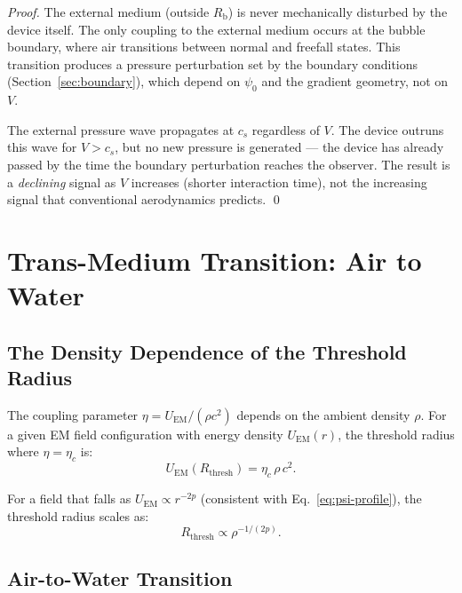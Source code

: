 \documentclass[12pt, letterpaper]{article}
\theoremstyle{definition}
\theoremstyle{remark}
\newcommand{\etac}{\eta_c}
\newcommand{\Rbub}{R_{\mathrm{b}}}
\newcommand{\cs}{c_s}
\begin{document}
\begin{proof}
The external medium (outside $\Rbub$) is never mechanically disturbed by the
device itself. The only coupling to the external medium occurs at the bubble
boundary, where air transitions between normal and freefall states. This
transition produces a pressure perturbation set by the boundary conditions
(Section~\ref{sec:boundary}), which depend on $\psi_0$ and the gradient
geometry, not on $V$.

The external pressure wave propagates at $\cs$ regardless of $V$. The device
outruns this wave for $V > \cs$, but no new pressure is generated --- the
device has already passed by the time the boundary perturbation reaches the
observer. The result is a \emph{declining} signal as $V$ increases (shorter
interaction time), not the increasing signal that conventional aerodynamics
predicts. \qed
\end{proof}

\section{Trans-Medium Transition: Air to Water}
\label{sec:transmedium}

\subsection{The Density Dependence of the Threshold Radius}

The coupling parameter $\eta = U_{\mathrm{EM}}/(\rho c^2)$ depends on the
ambient density $\rho$. For a given EM field configuration with energy density
$U_{\mathrm{EM}}(r)$, the threshold radius where $\eta = \etac$ is:
\begin{equation}
U_{\mathrm{EM}}(R_{\mathrm{thresh}}) = \etac \,\rho\, c^2.
\label{eq:threshold-radius}
\end{equation}

For a field that falls as $U_{\mathrm{EM}} \propto r^{-2p}$ (consistent with
Eq.~\eqref{eq:psi-profile}), the threshold radius scales as:
\begin{equation}
R_{\mathrm{thresh}} \propto \rho^{-1/(2p)}.
\label{eq:Rthresh-scaling}
\end{equation}

\subsection{Air-to-Water Transition}
\end{document}
